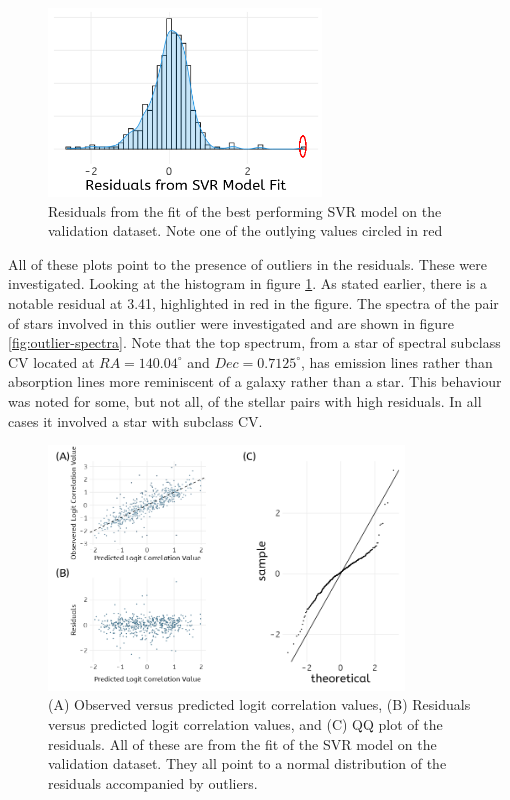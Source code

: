 \documentclass[preprint, 3p,
authoryear]{elsarticle} %
\begin{document}
\begin{figure}
  \centering
  \includegraphics[width=\columnwidth, height = 5cm, width = 10cm]{figures/histogram}
    \caption{Residuals from the fit of the best performing SVR model on the validation dataset. Note one of the outlying values circled in red}
    \label{fig:histogram-residuals}
\end{figure}

All of these plots point to the presence of outliers in the residuals.
These were investigated. Looking at the histogram in figure
\ref{fig:histogram-residuals}. As stated earlier, there is a notable
residual at 3.41, highlighted in red in the figure. The spectra of the
pair of stars involved in this outlier were investigated and are shown
in figure \ref{fig:outlier-spectra}. Note that the top spectrum, from a
star of spectral subclass CV located at \(RA = 140.04^{\circ}\) and
\(Dec = 0.7125^{\circ}\), has emission lines rather than absorption
lines more reminiscent of a galaxy rather than a star. This behaviour
was noted for some, but not all, of the stellar pairs with high
residuals. In all cases it involved a star with subclass CV.

\begin{figure}
\centering
  \includegraphics[width=\columnwidth, height = 6.5cm, width = 10cm]{figures/residuals}
    \caption{(A) Observed versus predicted logit correlation values, (B) Residuals versus predicted logit correlation values, and (C) QQ plot of the residuals. All of these are from the fit of the SVR model on the validation dataset. They all point to a normal distribution of the residuals accompanied by outliers.}
    \label{fig:resids}
\end{figure}
\end{document}

